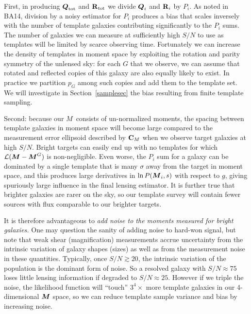 \documentclass[11pt,preprint,flushrt]{aastex}
\newcommand{\vecg}{\mbox{\boldmath $g$}}
\newcommand{\vecM}{\mbox{\boldmath $M$}}
\newcommand{\vecQ}{\mbox{\boldmath $Q$}}
\newcommand{\matR}{\mbox{$\bf R$}}
\newcommand{\matC}{\mbox{$\bf C$}}
\newcommand{\likeli}{\mbox{$\mathcal{L}$}}
\begin{document}
First, in producing $\vecQ_{\rm tot}$ and $\matR_{\rm tot}$ we divide
$\vecQ_i$ and $\matR_i$ by $P_i$.  As noted in BA14, division by a
noisy estimator for $P_i$ produces a bias that scales inversely with the number
of template galaxies contributing significantly to the $P_i$ sums.
The number of galaxies we can measure at sufficiently high $S/N$ to
use as templates will be limited by scarce observing time.
Fortunately we can increase the density of templates in
moment space by exploiting the rotation and parity symmetry of the
unlensed sky: for each $G$ that we observe, we can assume that rotated
and reflected copies of this galaxy are also equally likely to
exist. In practice we partition $p_G$ among such copies and add them
to the template set. We will investigate in Section~\ref{samplesec} the bias
resulting from finite template sampling.

Second: 
because our \vecM\ consists of un-normalized moments, the spacing
between template galaxies in moment space will become large compared
to the measurement error ellipsoid described by $\matC_M$ when we
observe target galaxies at high $S/N$.  Bright targets can easily end
up with no templates for which $\likeli(\vecM - \vecM^G)$ is
non-negligible.  Even worse, the $P_i$ sum for a galaxy can be
dominated by a single template that is many $\sigma$ away from the
target in moment space, and this produces large derivatives in $\ln
P(\vecM_i,s)$ with respect to \vecg, giving spuriously large influence in the
final lensing estimator. It is further true that brighter galaxies are rarer
on the sky, so our template survey will contain fewer sources with
flux comparable to our brighter targets.

It is therefore advantageous to \emph{add noise to the moments
  measured for bright galaxies.}  One may question the sanity of
adding noise to hard-won signal, but note that weak shear (magnification)
measurements accrue uncertainty from the intrinsic variation of galaxy shapes
(sizes) as well as from the measurement noise in these quantities.
Typically, once
$S/N\gtrsim 20$, the intrinsic variation of the population is the
dominant form of noise.  So a resolved galaxy with $S/N\approx75$
loses little lensing information
if degraded to $S/N\approx 25$. 
However if we triple the
noise, the likelihood function will
``touch'' $3^4 \times$ more template galaxies in our 4-dimensional
$\vecM$ space, so we can reduce template sample variance and bias by
increasing noise.  
\end{document}
